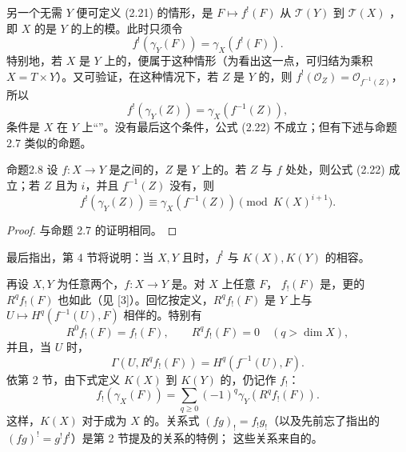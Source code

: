 另一个无需 $Y$ 便可定义 (2.21) 的情形，是 $F\mapsto f^!(F)$ 从 $\mathscr T(Y)$ 到 $\mathscr T(X)$ ，即 $X$ 的是 $Y$ 的上的模。此时只须令
\[
f^!(\gamma_Y(F))=\gamma_X(f^!(F)).
\]
特别地，若 $X$ 是 $Y$ 上的，便属于这种情形（为看出这一点，可归结为乘积 $X=T\times Y$）。又可验证，在这种情况下，若 $Z$ 是 $Y$ 的，则 $f^!(\mathcal O_Z)=\mathcal O_{f^{-1}(Z)}$，所以
\[
f^!(\gamma_Y(Z))=\gamma_X(f^{-1}(Z)),\tag{2.22}
\]
条件是 $X$ 在 $Y$ 上“”。没有最后这个条件，公式 (2.22) 不成立；但有下述与命题 2.7 类似的命题。
\begin{SGAresult}{命题}{2.8}
设 $f:X\to Y$ 是之间的，$Z$ 是 $Y$ 上的。若 $Z$ 与 $f$ 处处，则公式 (2.22) 成立；若 $Z$ 且为 $i$，并且 $f^{-1}(Z)$ 没有，则
\[
f^!(\gamma_Y(Z))\equiv\gamma_X(f^{-1}(Z))\pmod {K(X)^{i+1}}.\tag{2.23}
\]
\end{SGAresult}
\begin{proof}与命题 2.7 的证明相同。\end{proof}
最后指出，第 4 节将说明：当 $X,Y$ 且时，$f^!$ 与 $K(X),K(Y)$ 的相容。

再设 $X,Y$ 为任意两个，$f:X\to Y$ 是。对 $X$ 上任意 $F$， $f_!(F)$ 是，更的 $R^qf_!(F)$ 也如此（见 [3]）。回忆按定义，$R^qf_!(F)$ 是 $Y$ 上与 $U\mapsto H^q(f^{-1}(U),F)$ 相伴的。特别有
\[
R^0f_!(F)=f_!(F),\qquad R^qf_!(F)=0\quad(q>\dim X),\tag{2.24}
\]
并且，当 $U$ 时，
\[
\Gamma(U,R^qf_!(F))=H^q(f^{-1}(U),F).\tag{2.25}
\]
依第 2 节，由下式定义 $K(X)$ 到 $K(Y)$ 的，仍记作 $f_!$：
\[
f_!(\gamma_X(F))=\sum_{q\geq0}(-1)^q\gamma_Y(R^qf_!(F)).\tag{2.26}
\]
这样，$K(X)$ 对于成为 $X$ 的。关系式 $(fg)_!=f_!g_!$（以及先前忘了指出的 $(fg)^!=g^!f^!$）是第 2 节提及的关系的特例；
这些关系来自的。

